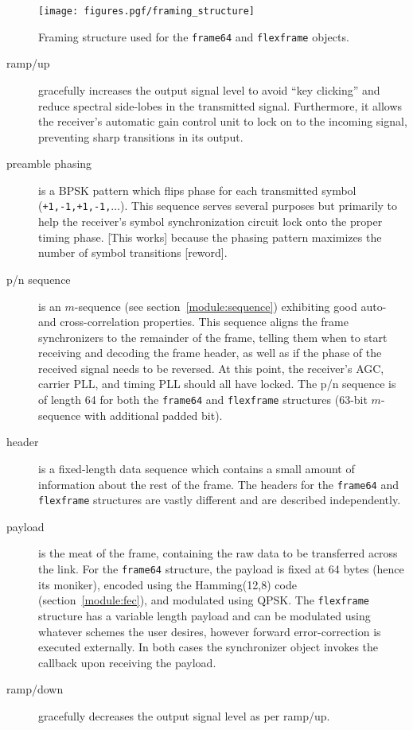 % 
%
\begin{figure}
\centering
  \texttt{[image: figures.pgf/framing\_structure]}
\caption{
    Framing structure used for the {\tt frame64} and {\tt flexframe}
    objects.}
\label{fig:module:framing:structure}
\end{figure}


\begin{description}
\item[{\sf ramp/up}]
    gracefully increases the output signal level to avoid ``key clicking'' and
    reduce spectral side-lobes in the transmitted signal.
    Furthermore, it allows the receiver's automatic gain control unit to
    lock on to the incoming signal, preventing sharp transitions in its
    output.
\item[{\sf preamble phasing}]
    is a BPSK pattern which flips phase for each transmitted symbol
    ({\tt +1,-1,+1,-1,$\ldots$}).
    This sequence serves several purposes but primarily to help the receiver's
    symbol synchronization circuit lock onto the proper timing phase.
    [This works] because the phasing pattern maximizes the number of symbol
    transitions [reword].
\item[{\sf p/n sequence}]
    is an $m$-sequence (see section~\ref{module:sequence}) exhibiting good
    auto- and cross-correlation properties.
    This sequence aligns the frame synchronizers to the remainder of the
    frame, telling them when to start receiving and decoding the frame header,
    as well as if the phase of the received signal needs to be reversed.
    At this point, the receiver's AGC, carrier PLL, and timing PLL should all
    have locked.
    The p/n sequence is of length 64 for both the {\tt frame64} and
    {\tt flexframe} structures (63-bit $m$-sequence with additional padded
    bit).
\item[{\sf header}]
    is a fixed-length data sequence which contains a small amount of
    information about the rest of the frame.
    The headers for the {\tt frame64} and {\tt flexframe} structures are
    vastly different and are described independently.
\item[{\sf payload}]
    is the meat of the frame, containing the raw data to be transferred across
    the link.
    For the {\tt frame64} structure, the payload is fixed at 64 bytes (hence
    its moniker), encoded using the Hamming(12,8) code
    (section~\ref{module:fec}), and modulated using QPSK.
    The {\tt flexframe} structure has a variable length payload and can be
    modulated using whatever schemes the user desires, however forward
    error-correction is executed externally.
    In both cases the synchronizer object invokes the callback upon receiving
    the payload.
\item[{\sf ramp/down}]
    gracefully decreases the output signal level as per ramp/up.
\end{description}

